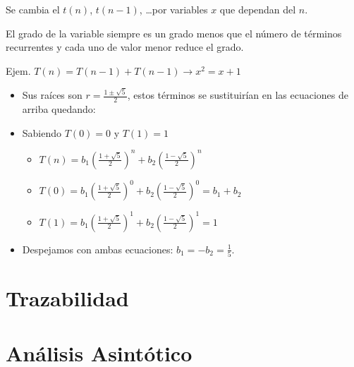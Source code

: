Se cambia el $t(n)$, $t(n-1)$, \ldots por variables $x$ que dependan del $n$.

El grado de la variable siempre es un grado menos que el número de términos recurrentes y cada uno de valor menor reduce el grado.

Ejem. $T(n)=T(n-1)+T(n-1) \rightarrow x^2= x + 1$
\begin{itemize}
  \item Sus raíces son $r = \frac{1\pm \sqrt{5}}{2}$, estos términos se sustituirían en las ecuaciones de arriba quedando:
  \item Sabiendo $T(0) = 0$ y $T(1)=1$
  \begin{itemize}
    \item $T(n)= b_1(\frac{1+ \sqrt{5}}{2})^n + b_2(\frac{1- \sqrt{5}}{2})^n$
    \item $T(0)= b_1(\frac{1+ \sqrt{5}}{2})^0 + b_2(\frac{1- \sqrt{5}}{2})^0 = b_1 + b_2$
    \item $T(1)= b_1(\frac{1+ \sqrt{5}}{2})^1 + b_2(\frac{1- \sqrt{5}}{2})^1 = 1$
  \end{itemize}
  \item Despejamos con ambas ecuaciones: $b_1 = -b_2 = \frac{1}{5}$.
\end{itemize}

\section{Trazabilidad}\label{sec:tratabilidad}


\section{Análisis Asintótico}\label{sec:análisis-asintótico}